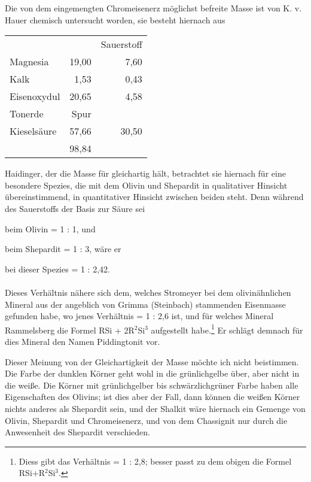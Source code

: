 \documentclass[a4paper, 11pt, oneside]{article}
\begin{document}
Die von dem eingemengten Chromeisenerz möglichst befreite Masse ist von K. v. Hauer chemisch untersucht worden, sie besteht hiernach aus
\begin{center}
\begin{tabular}{ l r r }
     & & Sauerstoff\\
    Magnesia & 19,00 & 7,60\\
    Kalk & 1,53 & 0,43\\
    Eisenoxydul & 20,65 & 4,58\\
    Tonerde & Spur & \\
    Kieselsäure & 57,66 & 30,50\\
     & 98,84\\
\end{tabular}
\end{center}
Haidinger, der die Masse für gleichartig hält, betrachtet sie hiernach für eine besondere Spezies, die mit dem Olivin und Shepardit in qualitativer Hinsicht übereinstimmend, in quantitativer Hinsicht zwischen beiden steht. Denn während des Sauerstoffs der Basis zur Säure sei
\begin{center}
beim Olivin = 1 : 1, und  
\end{center}
\begin{center}
beim Shepardit = 1 : 3, wäre er  
\end{center}
\begin{center}
bei dieser Spezies = 1 : 2,42.  
\end{center}
\paragraph{}
Dieses Verhältnis nähere sich dem, welches Stromeyer bei dem olivinähnlichen Mineral aus der angeblich von Grimma (Steinbach) stammenden Eisenmasse gefunden habe, wo jenes Verhältnis = 1 : 2,6 ist, und für welches Mineral Rammelsberg die Formel RSi + 2R$^{2}$Si$^{3}$ aufgestellt habe.\footnote{Diess gibt das Verhältnis = 1 : 2,8; besser passt zu dem obigen die Formel RSi+R$^{2}$Si$^{3}$.} Er schlägt demnach für dies Mineral den Namen Piddingtonit vor.

Dieser Meinung von der Gleichartigkeit der Masse möchte ich nicht beistimmen. Die Farbe der dunklen Körner geht wohl in die grünlichgelbe über, aber nicht in die weiße. Die Körner mit grünlichgelber bis schwärzlichgrüner Farbe haben alle Eigenschaften des Olivins; ist dies aber der Fall, dann können die weißen Körner nichts anderes als Shepardit sein, und der Shalkit wäre hiernach ein Gemenge von Olivin, Shepardit und Chromeisenerz, und von dem Chassignit nur durch die Anwesenheit des Shepardit verschieden.
\end{document}
